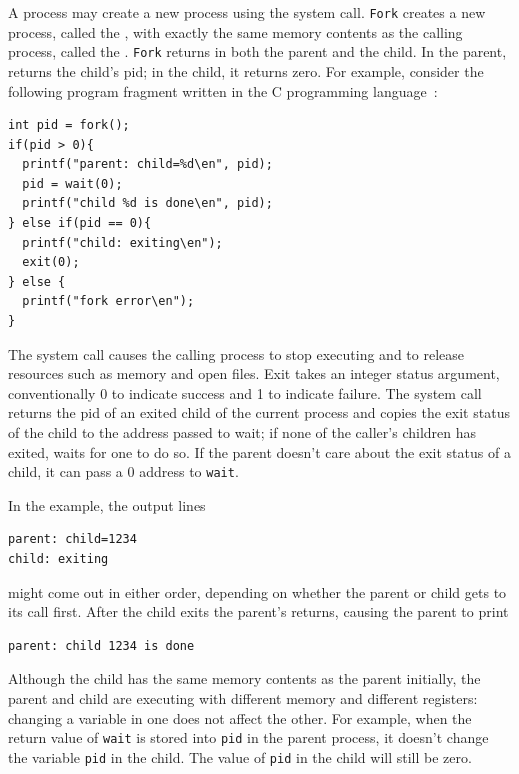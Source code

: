 A process may create a new process using the
system call.
\lstinline{Fork}
creates a new process, called the 
, 
with exactly the same memory contents
as the calling process, called the 
.
\lstinline{Fork}
returns in both the parent and the child.
In the parent,
returns the child's pid;
in the child, it returns zero.
For example, consider the following program fragment written in the C
programming language~\cite{kernighan}:
\begin{lstlisting}[]
int pid = fork();
if(pid > 0){
  printf("parent: child=%d\en", pid);
  pid = wait(0);
  printf("child %d is done\en", pid);
} else if(pid == 0){
  printf("child: exiting\en");
  exit(0);
} else {
  printf("fork error\en");
}
\end{lstlisting}
The
system call causes the calling process to stop executing and
to release resources such as memory and open files.
Exit takes an integer status argument,
conventionally 0 to indicate success and 1 to indicate failure.
The
system call returns the pid of an exited child of the
current process and copies the exit status of the child to the address
passed to wait; if none of the caller's children
has exited,
waits for one to do so.
If the parent doesn't care about the exit status of a child, it can
pass a 0 address to
\lstinline{wait}.

In the example, the output lines
\begin{lstlisting}[]
parent: child=1234
child: exiting
\end{lstlisting}
might come out in either order, depending on whether the
parent or child gets to its
call first.
After the child exits the parent's
returns, causing the parent to print
\begin{lstlisting}[]
parent: child 1234 is done
\end{lstlisting}
Although the child has the same memory contents as the parent initially, the
parent and child are executing with different memory and different registers:
changing a variable in one does not affect the other. For example, when the
return value of
\lstinline{wait}
is stored into
\lstinline{pid} 
in the parent process,
it doesn't change the variable 
\lstinline{pid}
in the child.  The value of
\lstinline{pid}
in the child will still be zero.

